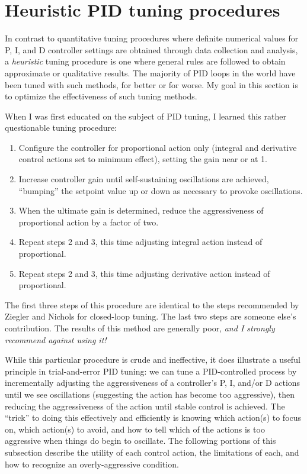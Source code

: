 






\filbreak
\section{Heuristic PID tuning procedures}

In contrast to quantitative tuning procedures where definite numerical values for P, I, and D controller settings are obtained through data collection and analysis, a \textit{heuristic} tuning procedure is one where general rules are followed to obtain approximate or qualitative results.  The majority of PID loops in the world have been tuned with such methods, for better or for worse.  My goal in this section is to optimize the effectiveness of such tuning methods.

When I was first educated on the subject of PID tuning, I learned this rather questionable tuning procedure:

\begin{enumerate}
\item Configure the controller for proportional action only (integral and derivative control actions set to minimum effect), setting the gain near or at 1.
\item Increase controller gain until self-sustaining oscillations are achieved, ``bumping'' the setpoint value up or down as necessary to provoke oscillations.
\item When the ultimate gain is determined, reduce the aggressiveness of proportional action by a factor of two.
\item Repeat steps 2 and 3, this time adjusting integral action instead of proportional.
\item Repeat steps 2 and 3, this time adjusting derivative action instead of proportional.
\end{enumerate}

The first three steps of this procedure are identical to the steps recommended by Ziegler and Nichols for closed-loop tuning.  The last two steps are someone else's contribution.  The results of this method are generally poor, \textit{and I strongly recommend against using it!}

\vskip 10pt

While this particular procedure is crude and ineffective, it does illustrate a useful principle in trial-and-error PID tuning: we can tune a PID-controlled process by incrementally adjusting the aggressiveness of a controller's P, I, and/or D actions until we see oscillations (suggesting the action has become too aggressive), then reducing the aggressiveness of the action until stable control is achieved.  The ``trick'' to doing this effectively and efficiently is knowing which action(s) to focus on, which action(s) to avoid, and how to tell which of the actions is too aggressive when things do begin to oscillate.  The following portions of this subsection describe the utility of each control action, the limitations of each, and how to recognize an overly-aggressive condition.

